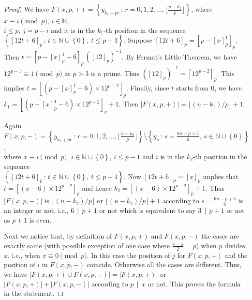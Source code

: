 \documentclass[11pt]{article}
\theoremstyle{definition}
\theoremstyle{remark}
\numberwithin{equation}{section}
\newcommand{\Nat}{\mathbb{N}}
\newcommand{\set}[1]{\left\{#1\right\}}
\newcommand{\Set}[2]{\set{#1\, :\, #2}}
\newcommand{\Mod}[3]{#1\equiv #2 \pmod{#3}}
\newcommand{\Div}[2]{#1\,\mid\, #2}
\begin{document}
\begin{proof}
We have $F(x,p,+)=\Set{y_{k_1+pr}}{r=0,1,2,\ldots,\lfloor \frac{n-k_1}{p}\rfloor}$, where $\Mod{x}{i}{p}$, $i\in\Nat$, \\
$i\leq p$, $j=p-i$ and it is in the $k_1$-th position in the sequence $\Set{[12t+6]_p}{t\in\Nat\cup\set{0},\ t\leq p-1}$. Suppose $[12t+6]_p=[p-[x]_p^1]_p$. Then $t=[p-[x]_p^1-6]_p\, ([12]_p)^{-1}$. By Fermat's Little Theorem, we have $\Mod{12^{p-1}}{1}{p}$ as $p>3$ is a prime. Thus $([12]_p)^{-1}=[12^{p-2}]_p$. This implies $t=[(p-[x]_p^1-6)\times 12^{p-2}]_p$. Finally, since $t$ starts from $0$, we have $k_1=[(p-[x]_p^1-6)\times 12^{p-2}]_p+1$. Then $|F(x,p,+)|=\lfloor (n-k_1)/p\rfloor+1$. 

\vspace{1em}
\noindent
Again $F(x,p,-)=\Set{y_{k_2+pr}}{r=0,1,2,\ldots,\lfloor \frac{n-k_2}{p}\rfloor} \setminus\Set{y_s}{s=\frac{6n-p+5}{6},\ s\in\Nat\cup\set{0}}$,\\
 where $\Mod{x}{i}{p}$, $i\in\Nat\cup\set{0}$, $i\leq p-1$ and $i$ is in the $k_2$-th position in the sequence\\
 $\Set{[12t+6]_p}{t\in\Nat\cup\set{0},\ t\leq p-1}$. Now $[12t+6]_p=[x]_p$ implies that $t=[(x-6)\times 12^{p-2}]_p$ and hence $k_2=[(x-6)\times 12^{p-2}]_p+1$. Thus $|F(x,p,-)|$ is $\lfloor (n-k_2)/p\rfloor$ or $\lfloor (n-k_2)/p\rfloor +1$ according to $s=\frac{6n-p+5}{6}$ is an integer or not, i.e., $\Div{6}{p+1}$ or not which is equivalent to say $\Div{3}{p+1}$ or not as $p+1$ is even.

\vspace{1em}
\noindent
Next we notice that, by definition of $F(x,p,+)$ and $F(x,p,-)$ the cases are exactly same (with possible exception of one case where $\frac{x-y}{2}=p$) when $p$ divides $x$, i.e., when $\Mod{x}{0}{p}$. In this case the position of $j$ for $F(x,p,+)$ and the position of $i$ in $F(x,p,-)$ coincide. Otherwise all the cases are different. Thus, we have $|F(x,p,+)\cup F(x,p,-)|=|F(x,p,+)|$ or $|F(x,p,+)|+|F(x,p,-)|$ according to $\Div{p}{x}$ or not. This proves the formula in the statement. 
\end{proof}
\end{document}
